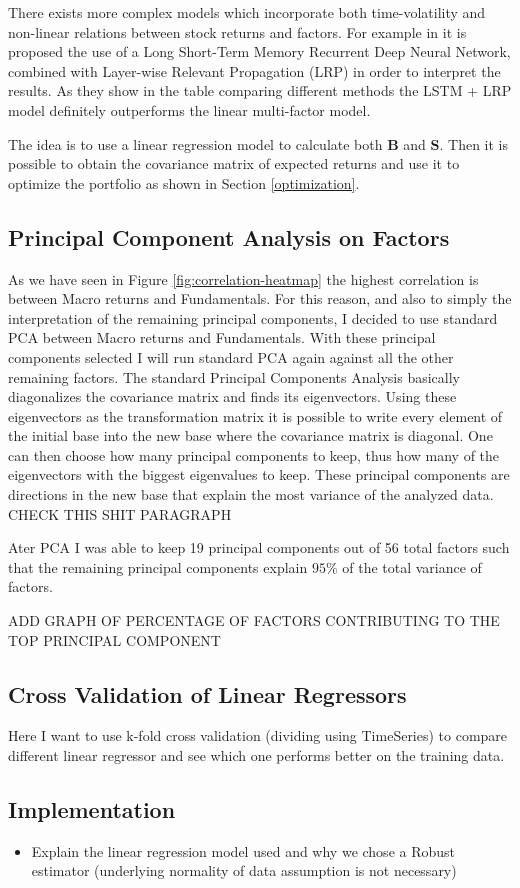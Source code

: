 There exists more complex models which incorporate both time-volatility and non-linear relations between stock returns and factors. For example in \cite{nakagawa} it is proposed the use of a Long Short-Term Memory Recurrent Deep Neural Network, combined with Layer-wise Relevant Propagation (LRP) in order to interpret the results. As they show in the table comparing different methods the LSTM + LRP model definitely outperforms the linear multi-factor model.

The idea is to use a linear regression model to calculate both $\mathbf{B}$ and $\mathbf{S}$. Then it is possible to obtain the covariance matrix of expected returns and use it to optimize the portfolio as shown in Section \ref{optimization}.

\subsection{Principal Component Analysis on Factors}
As we have seen in Figure \ref{fig:correlation-heatmap} the highest correlation is between Macro returns and Fundamentals. For this reason, and also to simply the interpretation of the remaining principal components, I decided to use standard PCA between Macro returns and Fundamentals. With these principal components selected I will run standard PCA again against all the other remaining factors.
The standard Principal Components Analysis basically diagonalizes the covariance matrix and finds its eigenvectors. Using these eigenvectors as the transformation matrix it is possible to write every element of the initial base into the new base where the covariance matrix is diagonal. One can then choose how many principal components to keep, thus how many of the eigenvectors with the biggest eigenvalues to keep. These principal components are directions in the new base that explain the most variance of the analyzed data. CHECK THIS SHIT PARAGRAPH

Ater PCA I was able to keep 19 principal components out of 56 total factors such that the remaining principal components explain $95$\% of the total variance of factors.

ADD GRAPH OF PERCENTAGE OF FACTORS CONTRIBUTING TO THE TOP PRINCIPAL COMPONENT 

\subsection{Cross Validation of Linear Regressors}
Here I want to use k-fold cross validation (dividing using TimeSeries) to compare different linear regressor and see which one performs better on the training data.

\subsection{Implementation}

\begin{itemize}
	\item Explain the linear regression model used and why we chose a Robust estimator (underlying normality of data assumption is not necessary)
\end{itemize}


